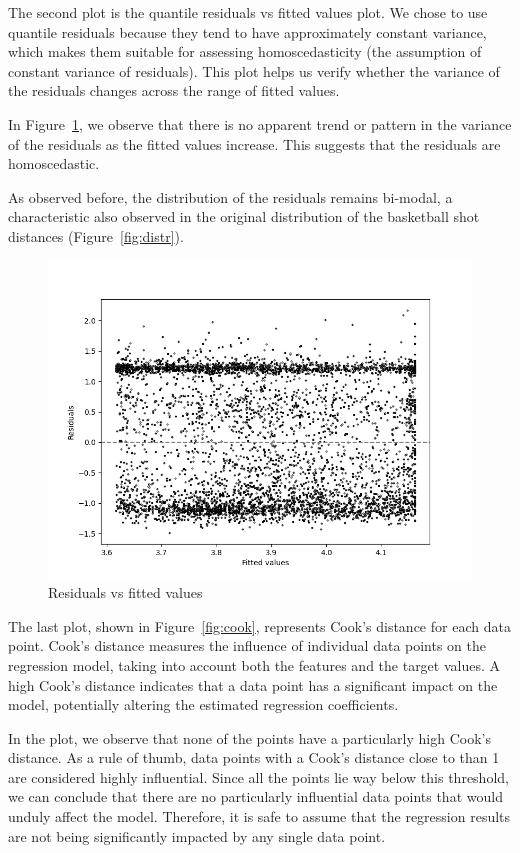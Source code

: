 \documentclass[9pt]{IEEEtran}
\begin{document}
The second plot is the quantile residuals vs fitted values plot. We chose to use quantile
 residuals because they tend to have approximately constant variance, which makes them suitable
  for assessing homoscedasticity (the assumption of constant variance of residuals). This plot
   helps us verify whether the variance of the residuals changes across the range of fitted values.

In Figure~\ref{fig:res_vs_fitted}, we observe that there is no apparent trend or pattern in the 
variance of the residuals as the fitted values increase. This suggests that the residuals are 
homoscedastic.

As observed before, the distribution of the residuals remains bi-modal,
 a characteristic also observed in the original distribution of the basketball
  shot distances (Figure~\ref{fig:distr}). 


\begin{figure}[h]
    \centering
    \includegraphics[width=0.9\columnwidth]{figures/res_vs_fitted.png}
    \caption{Residuals vs fitted values}
    \label{fig:res_vs_fitted}
\end{figure}

The last plot, shown in Figure~\ref{fig:cook}, represents Cook's distance for each data point.
 Cook's distance measures the influence of individual data points on the regression model,
  taking into account both the features and the target values. A high Cook's distance indicates
   that a data point has a significant impact on the model, potentially altering the estimated 
   regression coefficients.

In the plot, we observe that none of the points have a particularly high Cook's distance.
 As a rule of thumb, data points with a Cook's distance close to  than 1 are 
 considered highly influential. Since all the points lie way below this threshold, we can 
 conclude that there are no particularly influential data points that would unduly affect 
 the model. Therefore, it is safe to assume that the regression results are not being 
 significantly impacted by any single data point.
\end{document}
